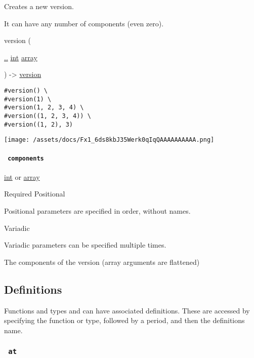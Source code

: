 Creates a new version.

It can have any number of components (even zero).

{ version } (

{ \hyperref[constructor-parameters-components]{..}
\href{/docs/reference/foundations/int/}{int}
\href{/docs/reference/foundations/array/}{array} }

) -\textgreater{} \href{/docs/reference/foundations/version/}{version}

\begin{verbatim}
#version() \
#version(1) \
#version(1, 2, 3, 4) \
#version((1, 2, 3, 4)) \
#version((1, 2), 3)
\end{verbatim}

\texttt{[image: /assets/docs/Fx1\_6ds8kbJ35Werk0qIqQAAAAAAAAAA.png]}

\paragraph{\texorpdfstring{\texttt{\ components\ }}{ components }}\label{constructor-components}

\href{/docs/reference/foundations/int/}{int} {or}
\href{/docs/reference/foundations/array/}{array}

{Required} {{ Positional }}

\phantomsection\label{constructor-components-positional-tooltip}
Positional parameters are specified in order, without names.

{{ Variadic }}

\phantomsection\label{constructor-components-variadic-tooltip}
Variadic parameters can be specified multiple times.

The components of the version (array arguments are flattened)

\subsection{\texorpdfstring{{ Definitions
}}{ Definitions }}\label{definitions}

\label{definitions-tooltip}
Functions and types and can have associated definitions. These are
accessed by specifying the function or type, followed by a period, and
then the definition\textquotesingle s name.

\subsubsection{\texorpdfstring{\texttt{\ at\ }}{ at }}\label{definitions-at}

